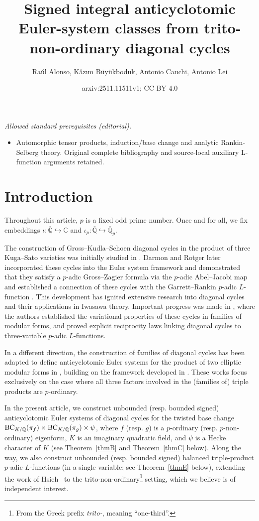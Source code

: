 \documentclass{amsart}
\title{Signed integral anticyclotomic Euler-system classes from trito-non-ordinary diagonal cycles}
\author{Raúl Alonso, Kâzım Büyükboduk, Antonio Cauchi, Antonio Lei}
\date{arxiv:2511.11511v1; CC BY 4.0}
\numberwithin{equation}{section}
\newcommand{\bb}{\mathbb}
\newcommand{\QQ}{\mathbb{Q}}
\begin{document}
\maketitle
\noindent\textit{Allowed standard prerequisites (editorial).}\begin{itemize}
\item Automorphic tensor products, induction/base change and analytic Rankin-Selberg theory. Original complete bibliography and source-local auxiliary L-function arguments retained.
\end{itemize}\medskip
\section{Introduction}
Throughout this article, $p$ is a fixed odd prime number. Once and for all, we fix embeddings $\iota:\overline{\bb{Q}}\hookrightarrow \bb{C}$ and $\iota_p:\overline{\bb{Q}}\hookrightarrow \overline{\bb{Q}}_p$.

The construction of Gross--Kudla--Schoen diagonal cycles in the product of three Kuga--Sato varieties was initially studied in \cite{GrossSchoen-cycle,grosskudla}. Darmon and Rotger later incorporated these cycles into the Euler system framework and demonstrated that they satisfy a $p$-adic Gross--Zagier formula via the $p$-adic Abel--Jacobi map and established a connection of these cycles with the Garrett--Rankin $p$-adic $L$-function \cite{darmonrotger14,darmonrotger17}. This development has ignited extensive research into diagonal cycles and their applications in Iwasawa theory. Important progress was made in \cite{asterisque}, where the authors established the variational properties of these cycles in families of modular forms, and proved explicit reciprocity laws linking diagonal cycles to three-variable $p$-adic $L$-functions.


In a different direction, the construction of families of diagonal cycles has been adapted to define anticyclotomic Euler systems for the product of two elliptic modular forms in \cite{ACR25,ACR}, building on the framework developed in \cite{JNS}. These works focus exclusively on the case where all three factors involved in the (families of) triple products are $p$-ordinary.


In the present article, we construct unbounded (resp. bounded signed) anticyclotomic Euler systems of diagonal cycles for the twisted base change ${\rm BC}_{K/\QQ}(\pi_f)\times {\rm BC}_{K/\QQ}(\pi_g)\times \psi$, where $f$ (resp. $g$) is a $p$-ordinary (resp. $p$-non-ordinary) eigenform, $K$ is an imaginary quadratic field, and $\psi$ is a Hecke character of $K$ (see Theorem~\ref{thmB} and Theorem~\ref{thmC} below).  Along the way, we also construct unbounded (resp. bounded signed) balanced triple-product $p$-adic $L$-functions (in a single variable; see Theorem~\ref{thmE} below), extending the work of Hsieh~\cite{hsiehpadicbalanced} to the trito-non-ordinary\footnote{From the Greek prefix \textit{trito-}, meaning ``one-third''.} setting, which we believe is of independent interest.
\end{document}
